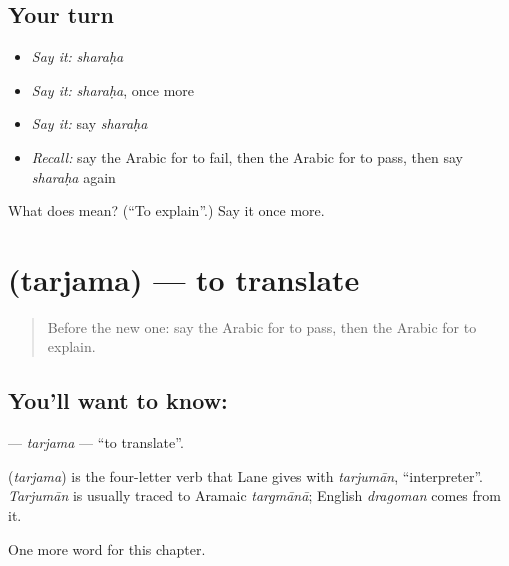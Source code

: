 \subsection*{Your turn}
\begin{itemize}
\raggedright
  \item \emph{Say it:} \emph{sharaḥa}
  \item \emph{Say it:} \emph{sharaḥa}, once more
  \item \emph{Say it:} say \emph{sharaḥa}
  \item \emph{Recall:} say the Arabic for to fail, then the Arabic for to pass, then say \emph{sharaḥa} again
\end{itemize}

\begin{tcolorbox}[breakable,colback=teal!4,colframe=teal!35!black,title={Before you move on}]
What does  mean? (\textquotedblleft{}To explain\textquotedblright{}.) Say it once more.
\end{tcolorbox}
\section[\texorpdfstring{\ar{ترجم} (tarjama)}{ترجم (tarjama)}]{ (tarjama) — to translate}

\label{lesson:AR-C256-tarjama}



\begin{quote}
Before the new one: say the Arabic for to pass, then the Arabic for to explain.
\end{quote}

\subsection*{You'll want to know: }
\textbf{} — \emph{tarjama} — \textquotedblleft{}to translate\textquotedblright{}.

\begin{cousinweb}
\textbf{} (\emph{tarjama}) is the four-letter verb that Lane gives with \emph{tarjumān}, \textquotedblleft{}interpreter\textquotedblright{}. \emph{Tarjumān} is usually traced to Aramaic \emph{targmānā}; English \emph{dragoman} comes from it.
\end{cousinweb}

\begin{grammarlens}[title={What you've built}]
One more word for this chapter.
\end{grammarlens}

